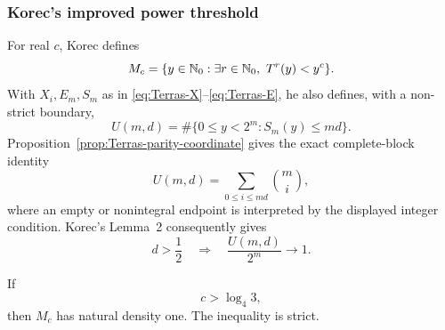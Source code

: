 \subsubsection{Korec's improved power threshold}

For real \(c\), Korec defines
\begin{equation}
\label{eq:Korec-Mc}
 M_c=\{y\in\mathbb{N}_{0}:\exists r\in\mathbb{N}_{0},\ T^r(y)<y^c\}.
\end{equation}
With \(X_i,E_m,S_m\) as in
\eqref{eq:Terras-X}--\eqref{eq:Terras-E}, he also defines, with a
non-strict boundary,
\begin{equation}
\label{eq:Korec-Umd}
 U(m,d)=\#\{0\le y<2^m:S_m(y)\le md\}.
\end{equation}
Proposition~\ref{prop:Terras-parity-coordinate} gives the exact complete-block
identity
\[
 U(m,d)=\sum_{0\le i\le md}\binom mi,
\]
where an empty or nonintegral endpoint is interpreted by the displayed
integer condition.  Korec's Lemma~2 consequently gives
\begin{equation}
\label{eq:Korec-CLT}
 d>\frac12
 \quad\Longrightarrow\quad
 \frac{U(m,d)}{2^m}\longrightarrow1.
\end{equation}

\begin{theorem}
\label{thm:Korec-density-estimate}
If
\[
 c>\log_4 3,
\]
then \(M_c\) has natural density one.  The inequality is strict.
\end{theorem}

